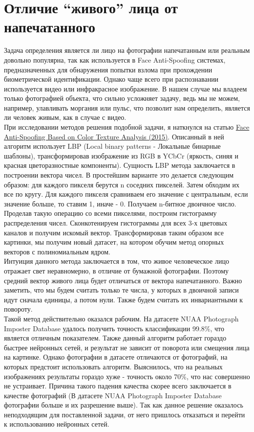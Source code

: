 \documentclass[a4paper,14pt]{extarticle}
\newcommand{\bibref}[3]{\hyperlink{#1}{#2 (#3)}} %
\begin{document}
    \section{Отличие “живого” лица от напечатанного}
    Задача определения является ли лицо на фотографии напечатанным или реальным довольно популярна, так как используется в Face Anti-Spoofing системах, предназначенных для обнаружения попытки взлома при прохождении биометрической идентификации. Однако чаще всего при распознавании используется видео или инфракрасное изображение. В нашем случае мы владеем только фотографией объекта, что сильно усложняет задачу, ведь мы не можем, например, улавливать моргания или пульс, что позволит нам определить, является ли человек живым, как в случае с видео.\\
    При исследовании методов решения подобной задачи, я наткнулся на статью \bibref{lbp}{Face Anti-Spoofing Based on Color Texture Analysis}{2015}. Описанный в ней алгоритм использует LBP (Local binary patterns - Локальные бинарные шаблоны), трансформировав изображение из RGB в YCbCr (яркость, синяя и красная цветоразностные компоненты). Сущность LBP метода заключается в построении вектора чисел. В простейшим варианте это делается следующим образом: для каждого пикселя берутся n соседних пикселей. Затем обходим их все по кругу. Для каждого пикселя сравниваем его значение с центральным, если значение больше, то ставим 1, иначе - 0. Получаем n-битное двоичное число. Проделав такую операцию со всеми пикселями, построим гистограмму распределения чисел. Сконкотенируем гистограммы для всех 3-х цветовых каналов и получим искомый вектор. Трансформировав таким образом все картинки, мы получим новый датасет, на котором обучим метод опорных векторов с полиномиальным ядром.\\
    Интуиция данного метода заключается в том, что живое человеческое лицо отражает свет неравномерно, в отличие от бумажной фотографии. Поэтому средний вектор живого лица будет отличаться от вектора напечатанного. Важно заметить, что мы будем считать только те числа, у которых в двоичной записи идут сначала единицы, а потом нули. Также будем считать их инвариантными к повороту.\\
    Такой метод действительно оказался рабочим. На датасете NUAA Photograph Imposter Database удалось получить точность классификации 99.8\%, что является отличным показателем. Также данный алгоритм работает гораздо быстрее нейронных сетей, и результат не зависит от поворота или смещения лица на картинке. Однако фотографии в датасете отличаются от фотографий, на которых предстоит использовать алгоритм. Выяснилось, что на реальных изображениях результаты гораздо хуже - точность около 70\%, что нас совершенно не устраивает. Причина такого падения качества скорее всего заключается в качестве фотографий (В датасете NUAA Photograph Imposter Database фотографии больше и их разрешение выше). Так как данное решение оказалось неподходящим для поставленной задачи, от него пришлось отказаться и перейти к использованию нейронных сетей.
    \newpage
\end{document}
